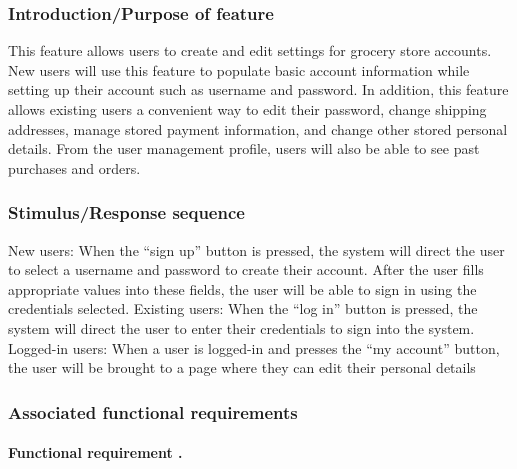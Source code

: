 \documentclass{scrreprt}
\theoremstyle{funreq}
\begin{document}
\subsubsection{Introduction/Purpose of feature}
This feature allows users to create and edit settings for grocery store accounts.  New users will use this feature to populate basic account information while setting up their account such as username and password.  In addition, this feature allows existing users a convenient way to edit their password, change shipping addresses, manage stored payment information, and change other stored personal details.  From the user management profile, users will also be able to see past purchases and orders.

\subsubsection{Stimulus/Response sequence}
\indent New users: When the “sign up” button is pressed, the system will direct the user to select a username and password to create their account.  After the user fills appropriate values into these fields, the user will be able to sign in using the credentials selected.
Existing users: When the “log in” button is pressed, the system will direct the user to enter their credentials to sign into the system.  
Logged-in users: When a user is logged-in and presses the “my account” button, the user will be brought to a page where they can edit their personal details

\subsubsection{Associated functional requirements}
\paragraph[]{Functional requirement .}
\end{document}
